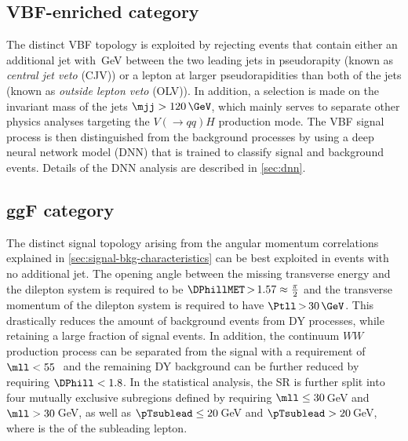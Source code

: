 

\subsection{VBF-enriched \TwoJet category}
\label{subsec:vbf-category}
The distinct VBF topology is exploited by rejecting events that contain either an additional jet with \,GeV between the two leading jets in pseudorapity (known as \emph{central jet veto} (CJV)) or a lepton at larger pseudorapidities than both of the jets (known as \emph{outside lepton veto} (OLV)).
In addition, a selection is made on the invariant mass of the jets $\mjj > 120\,\GeV$, which mainly serves to separate other physics analyses targeting the $V(\to qq)H$ production mode.
The VBF signal process is then distinguished from the background processes by using a deep neural network model (DNN) that is trained to classify signal and background events. Details of the DNN analysis are described in \cref{sec:dnn}.


\subsection{ggF \ZeroJet category}
\label{subsec:ggf-zero-jet-category}
The distinct signal topology arising from the angular momentum correlations explained in \cref{sec:signal-bkg-characteristics} can be best exploited in events with no additional jet.
The opening angle between the missing transverse energy and the dilepton system is required to be $\DPhillMET \,{>}\, 1.57 \approx \frac{\pi}{2}$ and the transverse momentum of the dilepton system is required to have $\Ptll \,{>}\, 30\,\GeV$.
This drastically reduces the amount of background events from DY processes, while retaining a large fraction of signal events.
In addition, the continuum $WW$ production process can be separated from the signal with a requirement of $\mll < 55$\,\GeV\ and the remaining DY background can be further reduced by requiring $\DPhill < 1.8$.
In the statistical analysis, the \ZeroJet SR is further split into four mutually exclusive subregions defined by requiring $\mll \le 30$\,GeV and $\mll > 30$\,GeV, as well as $\pTsublead \le 20$\,GeV and $\pTsublead > 20$\,GeV, where \pTsublead is the \pT of the subleading lepton.

